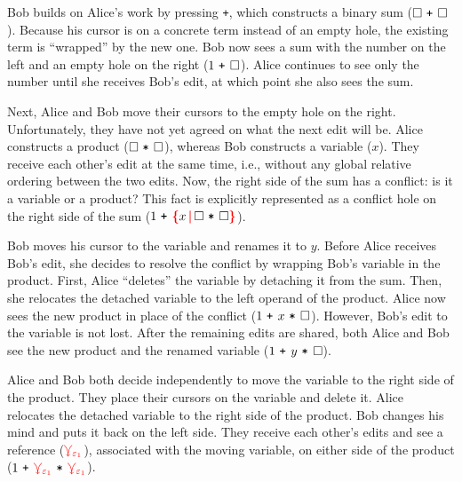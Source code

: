 \documentclass[nonacm, acmsmall, screen, review]{acmart}
\newcommand{\e}{\varepsilon}
\newcommand{\id}[1]{\textcolor{gray}{\ensuremath{#1}}}
\newcommand{\eid}[2]{{#2}^{\id{#1}}}
\newcommand{\hole}{\ensuremath{\square}} %
\newcommand{\conflictHole}[1]{%
{\noexpandarg\StrSubstitute{#1}{,}{\textcolor{red}{\,\textbf{|}\,}}[\myargs]%
{\textcolor{red}{\textbf{\{}}\myargs\textcolor{red}{\textbf{\}}}}}}%
\newcommand{\ePlus}[3]{#2~\eid{#1}{\texttt{+}}~#3}
\newcommand{\eTimes}[3]{#2~\eid{#1}{\texttt{*}}~#3}
\newcommand{\multiVertex}[1]{\textcolor{red}{\ensuremath{\curlyveedownarrow_{#1}}}}
\newcommand{\kbinput}[1]{\texttt{#1}}
\begin{document}
Bob builds on Alice's work by pressing \kbinput{+}, which constructs a binary sum ($\ePlus{}{\hole}{\hole}$).
Because his cursor is on a concrete term instead of an empty hole, the existing term is ``wrapped'' by the new one.
Bob now sees a sum with the number on the left and an empty hole on the right ($\ePlus{}{1}{\hole}$).
Alice continues to see only the number until she receives Bob's edit,
at which point she also sees the sum.

Next, Alice and Bob move their cursors to the empty hole on the right.
Unfortunately, they have not yet agreed on what the next edit will be.
Alice constructs a product ($\eTimes{}{\hole}{\hole}$),
whereas Bob constructs a variable ($x$).
They receive each other's edit at the same time, i.e., without any global relative ordering between the two edits.
Now, the right side of the sum has a conflict: is it a variable or a product?
This fact is explicitly represented as a conflict hole on the right side of the sum ($\ePlus{}{1}{\conflictHole{x, \eTimes{}{\hole}{\hole}}}$).

Bob moves his cursor to the variable and renames it to $y$.
Before Alice receives Bob's edit,
she decides to resolve the conflict by wrapping Bob's variable in the product.
First, Alice ``deletes'' the variable by detaching it from the sum.
Then, she relocates the detached variable to the left operand of the product.
Alice now sees the new product in place of the conflict ($\ePlus{}{1}{\eTimes{}{x}{\hole}}$).
However, Bob's edit to the variable is not lost.
After the remaining edits are shared,
both Alice and Bob see the new product and the renamed variable ($\ePlus{}{1}{\eTimes{}{y}{\hole}}$).

Alice and Bob both decide independently to move the variable to the right side of the product.
They place their cursors on the variable and delete it.
Alice relocates the detached variable to the right side of the product.
Bob changes his mind and puts it back on the left side.
They receive each other's edits and see a reference ($\multiVertex{\e_1}$), associated with the moving variable, on either side of the product ($\ePlus{}{1}{\eTimes{}{\multiVertex{\e_1}}{\multiVertex{\e_1}}}$).
\end{document}
